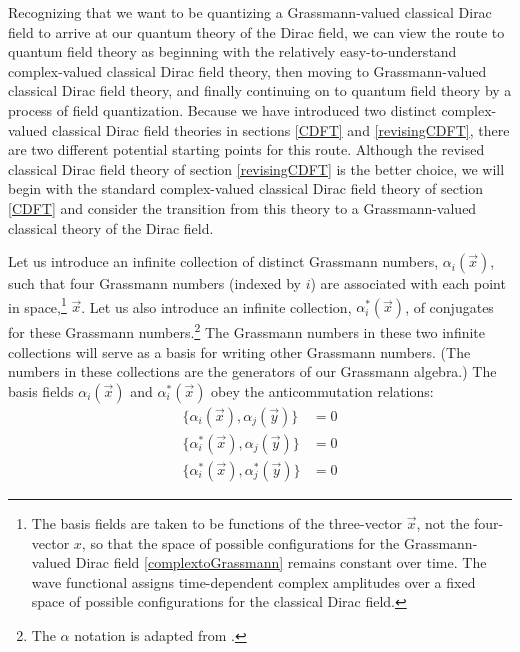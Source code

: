 \documentclass[onecolumn,secnumarabic,amsmath,amssymb,balancelastpage,nofootinbib]{article}
\begin{document}
Recognizing that we want to be quantizing a Grassmann-valued classical Dirac field to arrive at our quantum theory of the Dirac field, we can view the route to quantum field theory as beginning with the relatively easy-to-understand complex-valued classical Dirac field theory, then moving to Grassmann-valued classical Dirac field theory, and finally continuing on to quantum field theory by a process of field quantization.  Because we have introduced two distinct complex-valued classical Dirac field theories in sections \ref{CDFT} and \ref{revisingCDFT}, there are two different potential starting points for this route.  Although the revised classical Dirac field theory of section \ref{revisingCDFT} is the better choice, we will begin with the standard complex-valued classical Dirac field theory of section \ref{CDFT} and consider the transition from this theory to a Grassmann-valued classical theory of the Dirac field.

Let us introduce an infinite collection of distinct Grassmann numbers, $\alpha_i(\vec{x})$, such that four Grassmann numbers (indexed by $i$) are associated with each point in space,\footnote{The basis fields are taken to be functions of the three-vector $\vec{x}$, not the four-vector $x$, so that the space of possible configurations for the Grassmann-valued Dirac field \eqref{complextoGrassmann} remains constant over time.  The wave functional assigns time-dependent complex amplitudes over a fixed space of possible configurations for the classical Dirac field.} $\vec{x}$.  Let us also introduce an infinite collection, $\alpha^*_i(\vec{x})$, of conjugates for these Grassmann numbers.\footnote{The $\alpha$ notation is adapted from \citet[pg.\ 62--67]{berezin}.}  The Grassmann numbers in these two infinite collections will serve as a basis for writing other Grassmann numbers.  (The numbers in these collections are the generators of our Grassmann algebra.)  The basis fields $\alpha_i(\vec{x})$ and $\alpha^*_i(\vec{x})$ obey the anticommutation relations:
\begin{align}
\{\alpha_i(\vec{x}),\alpha_j(\vec{y})\}&=0
\nonumber
\\
\{\alpha^*_i(\vec{x}),\alpha_j(\vec{y})\}&=0
\nonumber
\\
\{\alpha^*_i(\vec{x}),\alpha^*_j(\vec{y})\}&=0
\label{alphaanticommutation}
\end{align}
\end{document}
